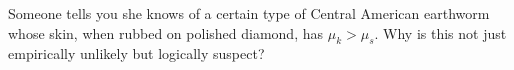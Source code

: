 Someone tells you she knows of a certain type of Central American
earthworm whose skin, when rubbed on polished diamond, has
$\mu_k>\mu_s$. Why is this not just empirically unlikely but
logically suspect?
